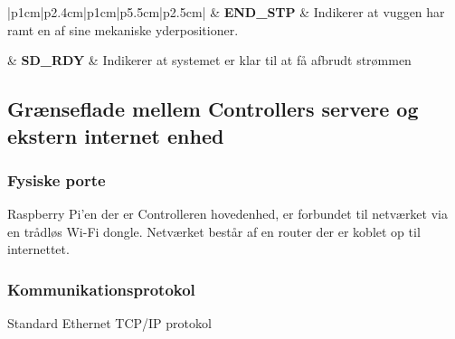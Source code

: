 \begin{center}
\begin{table}[H]
\begin{tabular}{|p{1cm}|p{2.4cm}|p{1cm}|p{5.5cm}|p{2.5cm}|}
	& {\textbf{END\_STP}} &  {Indikerer at vuggen har ramt en af sine mekaniske yderpositioner.} \\ 

	& {\textbf{SD\_RDY}} &  {Indikerer at systemet er klar til at få afbrudt strømmen} \\ \hline
\hline 
\end{tabular}
\end{table}
\end{center} 

\subsection{Grænseflade mellem Controllers servere og ekstern internet enhed}
\subsubsection*{Fysiske porte}

Raspberry Pi'en der er Controlleren hovedenhed, er forbundet til netværket via en trådløs Wi-Fi dongle. Netværket består af en router der er koblet op til internettet.

\subsubsection*{Kommunikationsprotokol}

Standard Ethernet TCP/IP protokol